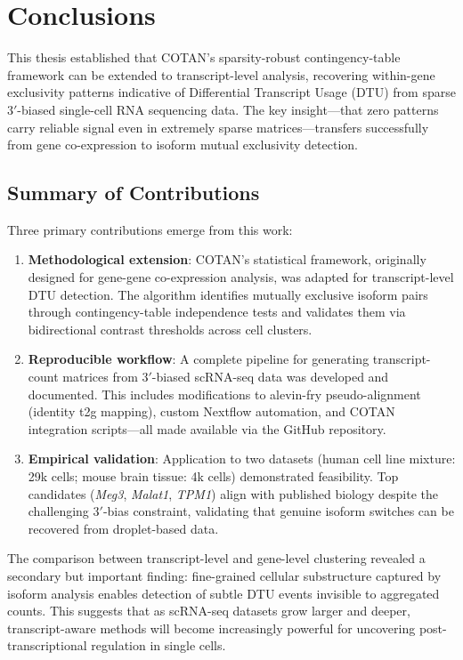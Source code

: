 \chapter{Conclusions}

This thesis established that COTAN's sparsity-robust contingency-table framework can be extended to transcript-level analysis, recovering within-gene exclusivity patterns indicative of Differential Transcript Usage (DTU) from sparse $3'$-biased single-cell RNA sequencing data. The key insight---that zero patterns carry reliable signal even in extremely sparse matrices---transfers successfully from gene co-expression to isoform mutual exclusivity detection.

\section{Summary of Contributions}

Three primary contributions emerge from this work:
\begin{enumerate}
    \item \textbf{Methodological extension}: COTAN's statistical framework, originally designed for gene-gene co-expression analysis, was adapted for transcript-level DTU detection. The algorithm identifies mutually exclusive isoform pairs through contingency-table independence tests and validates them via bidirectional contrast thresholds across cell clusters.

    \item \textbf{Reproducible workflow}: A complete pipeline for generating transcript-count matrices from $3'$-biased scRNA-seq data was developed and documented. This includes modifications to alevin-fry pseudo-alignment (identity t2g mapping), custom Nextflow automation, and COTAN integration scripts---all made available via the GitHub repository.

    \item \textbf{Empirical validation}: Application to two datasets (human cell line mixture: 29k cells; mouse brain tissue: 4k cells) demonstrated feasibility. Top candidates (\textit{Meg3}, \textit{Malat1}, \textit{TPM1}) align with published biology despite the challenging $3'$-bias constraint, validating that genuine isoform switches can be recovered from droplet-based data.
\end{enumerate}

The comparison between transcript-level and gene-level clustering revealed a secondary but important finding: fine-grained cellular substructure captured by isoform analysis enables detection of subtle DTU events invisible to aggregated counts. This suggests that as scRNA-seq datasets grow larger and deeper, transcript-aware methods will become increasingly powerful for uncovering post-transcriptional regulation in single cells.

